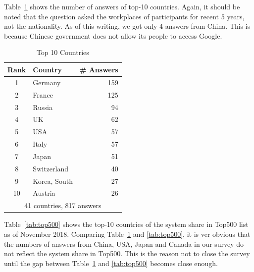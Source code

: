 \documentclass[submit,techrep,noauthor,english]{ipsj}
\begin{document}
Table~\ref{tab:countries} shows the number of answers of top-10
countries. Again, it should be noted that the question asked the
workplaces of participants for recent 5 years, not the nationality. As
of this writing, we got only 4 answers from China. This is because
Chinese government does not allow its people to access Google. 

\begin{table}[htb]%
\begin{center}%
\caption{Top 10 Countries}\label{tab:countries}%
\begin{tabular}{c|l|r}%
\hline%
Rank & Country & \# Answers \hspace{5mm} \\%
\hline%
1 & Germany 	& 159 \hspace{8mm} \\%
2 & France 	& 125 \hspace{8mm} \\%
3 & Russia 	& 94 \hspace{8mm} \\%
4 & UK 		& 62 \hspace{8mm} \\%
5 & USA 	& 57 \hspace{8mm} \\%
6 & Italy 	& 57 \hspace{8mm} \\%
7 & Japan 	& 51 \hspace{8mm} \\%
\hline
8 & Switzerland & 40 \hspace{8mm} \\%
9 & Korea, South & 27 \hspace{8mm} \\%
10 & Austria 	& 26 \hspace{8mm} \\%
\hline%
\multicolumn{3}{c}{41 countries, 817 answers} \\%
\end{tabular}%
\end{center}%
\end{table}%

Table~\ref{tab:top500} shows the top-10 countries of the system share
in Top500 list as of November 2018\cite{Top500}. Comparing
Table~\ref{tab:countries} and \ref{tab:top500}, it is ver obvious that
the numbers of answers from China, USA, Japan and Canada in our survey
do not reflect the system share in Top500.  This is the reason not to
close the survey until the gap between Table~\ref{tab:countries} and
\ref{tab:top500} becomes close enough.
\end{document}

